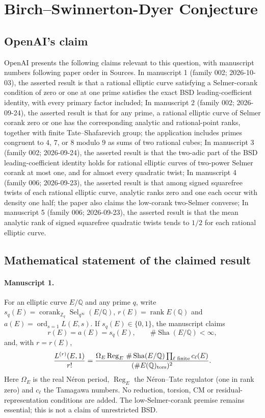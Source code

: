 \documentclass[11pt]{article}
\begin{document}
\section*{Birch–Swinnerton-Dyer Conjecture}

\subsection{OpenAI's claim}
OpenAI presents the following claims relevant to this question, with manuscript numbers following paper order in Sources. In manuscript 1 (family 002; 2026-10-03), the asserted result is that a rational elliptic curve satisfying a Selmer-corank condition of zero or one at one prime satisfies the exact BSD leading-coefficient identity, with every primary factor included; In manuscript 2 (family 002; 2026-09-24), the asserted result is that for any prime, a rational elliptic curve of Selmer corank zero or one has the corresponding analytic and rational-point ranks, together with finite Tate--Shafarevich group; the application includes primes congruent to $4$, $7$, or $8$ modulo $9$ as sums of two rational cubes; In manuscript 3 (family 002; 2026-09-24), the asserted result is that the two-adic part of the BSD leading-coefficient identity holds for rational elliptic curves of two-power Selmer corank at most one, and for almost every quadratic twist; In manuscript 4 (family 006; 2026-09-23), the asserted result is that among signed squarefree twists of each rational elliptic curve, analytic ranks zero and one each occur with density one half; the paper also claims the low-corank two-Selmer converse; In manuscript 5 (family 006; 2026-09-23), the asserted result is that the mean analytic rank of signed squarefree quadratic twists tends to $1/2$ for each rational elliptic curve.

\subsection{Mathematical statement of the claimed result}
\paragraph{Manuscript 1.}
For an elliptic curve $E/\mathbb Q$ and any prime $q$, write $s_q(E)=\operatorname{corank}_{\mathbb Z_q}\operatorname{Sel}_{q^{\infty}}(E/\mathbb Q)$, $r(E)=\operatorname{rank}E(\mathbb Q)$ and $a(E)=\operatorname{ord}_{s=1}L(E,s)$. If $s_q(E)\in\{0,1\}$, the manuscript claims
\[
 r(E)=a(E)=s_q(E),\qquad\#\operatorname{Sha}(E/\mathbb Q)<\infty,
\]
and, with $r=r(E)$,
\[
 \frac{L^{(r)}(E,1)}{r!}
 =\frac{\Omega_E\operatorname{Reg}_E\,\#\operatorname{Sha}(E/\mathbb Q)\prod_{\ell\text{ finite}}c_{\ell}(E)}
 {(\#E(\mathbb Q)_{\rm tors})^2}.
\]
Here $\Omega_E$ is the real N\'eron period, $\operatorname{Reg}_E$ the N\'eron--Tate regulator (one in rank zero) and $c_{\ell}$ the Tamagawa numbers. No reduction, torsion, CM or residual-representation conditions are added. The low-Selmer-corank premise remains essential; this is not a claim of unrestricted BSD.
\end{document}
